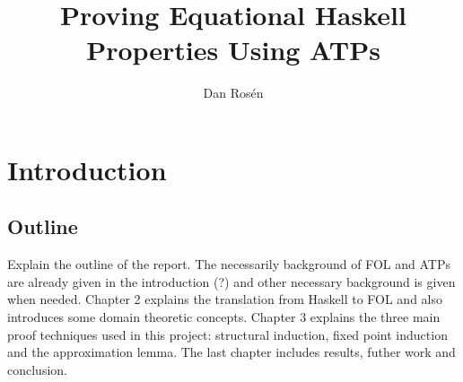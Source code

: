 \documentclass{report}
\begin{document}
\title{Proving Equational Haskell Properties Using ATPs}
\author{Dan Rosén}
\maketitle


\newpage
{}




\newpage
\tableofcontents
{}

\newpage
\setcounter{page}{1}

\chapter{Introduction}







\section{Outline}

Explain the outline of the report.  The necessarily background of FOL
and ATPs are already given in the introduction (?) and other
necessary background is given when needed.
Chapter 2 explains the translation from Haskell to FOL and also
introduces some domain theoretic concepts. Chapter 3 explains the
three main proof techniques used in this project: structural
induction, fixed point induction and the approximation lemma. The last
chapter includes results, futher work and conclusion.
\end{document}
